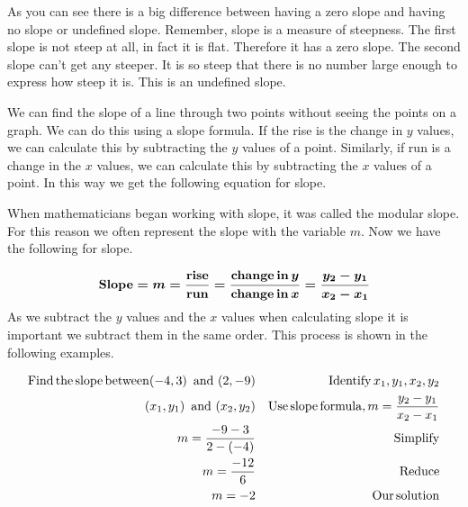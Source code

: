  As you can see there is a big difference between having a zero slope and
having no slope or undefined slope. Remember, slope is a measure of steepness.
The first slope is not steep at all, in fact it is flat. Therefore it has a
zero slope. The second slope can't get any steeper. It is so steep that there
is no number large enough to express how steep it is. This is an undefined
slope.\pp

 We can find the slope of a line through two points without seeing the points
on a graph. We can do this using a slope formula. If the rise is the change in
$y$ values, we can calculate this by subtracting the $y$ values of a point.
Similarly, if run is a change in the $x$ values, we can calculate this by
subtracting the $x$ values of a point. In this way we get the following
equation for slope.\pp

{}

 When mathematicians began working with slope, it was called the modular slope.
For this reason we often represent the slope with the variable $m$. Now we
have the following for slope.\pp

\bbm
\[ \boldsymbol{\operatorname{Slope} = m = \frac{\operatorname{rise}}{\operatorname{run}} =
   \frac{\operatorname{change} \operatorname{in} y}{\operatorname{change} \operatorname{in} x} = \frac{y_2 -
   y_1}{x_2 - x_1}} \]
\ebm 
\pp
As we subtract the $y$ values and the $x$ values when calculating slope it is
important we subtract them in the same order. This process is shown in the
following examples.

\begin{example}\label{Lin49}
  
  \begin{eqnarray*}
    \operatorname{Find} \operatorname{the} \operatorname{slope} \operatorname{between} (- 4, 3) \operatorname{~and~} (2,
    - 9) &  & \operatorname{Identify} x_1, y_1, x_2, y_2\\
    (x_1, y_1) \operatorname{~and~} (x_2, y_2) &  & \operatorname{Use} \operatorname{slope}
    \operatorname{formula}, m = \frac{y_2 - y_1}{x_2 - x_1}\\
    m = \frac{- 9 - 3}{2 - (- 4)} &  & \operatorname{Simplify}\\
    m = \frac{-12}{6} &  & \operatorname{Reduce}\\
    m = - 2 &  & \operatorname{Our} \operatorname{solution}
  \end{eqnarray*}
\end{example}

